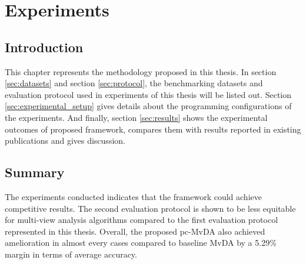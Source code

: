 
\chapter{Experiments} \label{chap:experimental_result}
    \section{Introduction}
        This chapter represents the methodology proposed in this thesis.
        In section \ref{sec:datasets} and section \ref{sec:protocol}, the benchmarking datasets and evaluation protocol used in experiments of this thesis will be listed out.
        Section \ref{sec:experimental_setup} gives details about the programming configurations of the experiments.
        And finally, section \ref{sec:results} shows the experimental outcomes of proposed framework, compares them with results reported in existing publications and gives discussion.

    
    
    
    

    \section{Summary}
        The experiments conducted indicates that the framework could achieve competitive results.
        The second evaluation protocol is shown to be less equitable for multi-view analysis algorithms compared to the first evaluation protocol represented in this thesis.
        Overall, the proposed pc-MvDA also achieved amelioration in almost every cases compared to baseline MvDA by a 5.29\% margin in terms of average accuracy.
